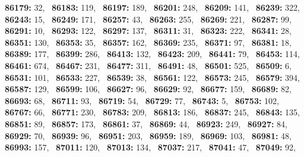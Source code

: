 \textbf{86179:} 32,\allowbreak~ 
\textbf{86183:} 119,\allowbreak~ 
\textbf{86197:} 189,\allowbreak~ 
\textbf{86201:} 248,\allowbreak~ 
\textbf{86209:} 141,\allowbreak~ 
\textbf{86239:} 322,\allowbreak~ 
\textbf{86243:} 15,\allowbreak~ 
\textbf{86249:} 171,\allowbreak~ 
\textbf{86257:} 43,\allowbreak~ 
\textbf{86263:} 255,\allowbreak~ 
\textbf{86269:} 221,\allowbreak~ 
\textbf{86287:} 99,\allowbreak~ 
\textbf{86291:} 10,\allowbreak~ 
\textbf{86293:} 122,\allowbreak~ 
\textbf{86297:} 137,\allowbreak~ 
\textbf{86311:} 31,\allowbreak~ 
\textbf{86323:} 222,\allowbreak~ 
\textbf{86341:} 28,\allowbreak~ 
\textbf{86351:} 130,\allowbreak~ 
\textbf{86353:} 35,\allowbreak~ 
\textbf{86357:} 162,\allowbreak~ 
\textbf{86369:} 235,\allowbreak~ 
\textbf{86371:} 97,\allowbreak~ 
\textbf{86381:} 18,\allowbreak~ 
\textbf{86389:} 177,\allowbreak~ 
\textbf{86399:} 286,\allowbreak~ 
\textbf{86413:} 132,\allowbreak~ 
\textbf{86423:} 209,\allowbreak~ 
\textbf{86441:} 79,\allowbreak~ 
\textbf{86453:} 114,\allowbreak~ 
\textbf{86461:} 674,\allowbreak~ 
\textbf{86467:} 231,\allowbreak~ 
\textbf{86477:} 311,\allowbreak~ 
\textbf{86491:} 48,\allowbreak~ 
\textbf{86501:} 525,\allowbreak~ 
\textbf{86509:} 6,\allowbreak~ 
\textbf{86531:} 101,\allowbreak~ 
\textbf{86533:} 227,\allowbreak~ 
\textbf{86539:} 38,\allowbreak~ 
\textbf{86561:} 122,\allowbreak~ 
\textbf{86573:} 245,\allowbreak~ 
\textbf{86579:} 394,\allowbreak~ 
\textbf{86587:} 129,\allowbreak~ 
\textbf{86599:} 106,\allowbreak~ 
\textbf{86627:} 96,\allowbreak~ 
\textbf{86629:} 92,\allowbreak~ 
\textbf{86677:} 159,\allowbreak~ 
\textbf{86689:} 82,\allowbreak~ 
\textbf{86693:} 68,\allowbreak~ 
\textbf{86711:} 93,\allowbreak~ 
\textbf{86719:} 54,\allowbreak~ 
\textbf{86729:} 77,\allowbreak~ 
\textbf{86743:} 5,\allowbreak~ 
\textbf{86753:} 102,\allowbreak~ 
\textbf{86767:} 66,\allowbreak~ 
\textbf{86771:} 230,\allowbreak~ 
\textbf{86783:} 209,\allowbreak~ 
\textbf{86813:} 186,\allowbreak~ 
\textbf{86837:} 245,\allowbreak~ 
\textbf{86843:} 135,\allowbreak~ 
\textbf{86851:} 89,\allowbreak~ 
\textbf{86857:} 173,\allowbreak~ 
\textbf{86861:} 37,\allowbreak~ 
\textbf{86869:} 44,\allowbreak~ 
\textbf{86923:} 249,\allowbreak~ 
\textbf{86927:} 84,\allowbreak~ 
\textbf{86929:} 70,\allowbreak~ 
\textbf{86939:} 96,\allowbreak~ 
\textbf{86951:} 203,\allowbreak~ 
\textbf{86959:} 189,\allowbreak~ 
\textbf{86969:} 103,\allowbreak~ 
\textbf{86981:} 48,\allowbreak~ 
\textbf{86993:} 157,\allowbreak~ 
\textbf{87011:} 120,\allowbreak~ 
\textbf{87013:} 134,\allowbreak~ 
\textbf{87037:} 217,\allowbreak~ 
\textbf{87041:} 47,\allowbreak~ 
\textbf{87049:} 92,\allowbreak~ 
